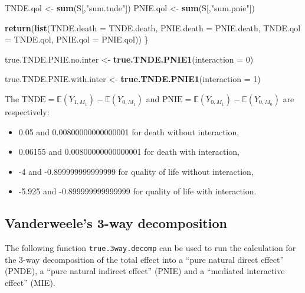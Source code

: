 \documentclass[
]{book}
\newenvironment{Shaded}{\begin{snugshade}}{\end{snugshade}}
\newcommand{\AttributeTok}[1]{\textcolor[rgb]{0.13,0.29,0.53}{#1}}
\newcommand{\DecValTok}[1]{\textcolor[rgb]{0.00,0.00,0.81}{#1}}
\newcommand{\FunctionTok}[1]{\textcolor[rgb]{0.13,0.29,0.53}{\textbf{#1}}}
\newcommand{\NormalTok}[1]{#1}
\newcommand{\OtherTok}[1]{\textcolor[rgb]{0.56,0.35,0.01}{#1}}
\newcommand{\StringTok}[1]{\textcolor[rgb]{0.31,0.60,0.02}{#1}}
\providecommand{\tightlist}{%
  \setlength{\itemsep}{0pt}\setlength{\parskip}{0pt}}
\begin{document}
\begin{Shaded}
\begin{Highlighting}[]
\NormalTok{  TNDE.qol }\OtherTok{\textless{}{-}} \FunctionTok{sum}\NormalTok{(S[,}\StringTok{"sum.tnde"}\NormalTok{])}
\NormalTok{  PNIE.qol }\OtherTok{\textless{}{-}} \FunctionTok{sum}\NormalTok{(S[,}\StringTok{"sum.pnie"}\NormalTok{])}
   
  \FunctionTok{return}\NormalTok{(}\FunctionTok{list}\NormalTok{(}\AttributeTok{TNDE.death =}\NormalTok{ TNDE.death, }\AttributeTok{PNIE.death =}\NormalTok{ PNIE.death, }
              \AttributeTok{TNDE.qol =}\NormalTok{ TNDE.qol, }\AttributeTok{PNIE.qol =}\NormalTok{ PNIE.qol))}
\NormalTok{\}}
\end{Highlighting}
\end{Shaded}

\begin{Shaded}
\begin{Highlighting}[]
\NormalTok{true.TNDE.PNIE.no.inter }\OtherTok{\textless{}{-}} \FunctionTok{true.TNDE.PNIE1}\NormalTok{(}\AttributeTok{interaction =} \DecValTok{0}\NormalTok{)}

\NormalTok{true.TNDE.PNIE.with.inter }\OtherTok{\textless{}{-}} \FunctionTok{true.TNDE.PNIE1}\NormalTok{(}\AttributeTok{interaction =} \DecValTok{1}\NormalTok{)}
\end{Highlighting}
\end{Shaded}

The \(\text{TNDE}=\mathbb{E}\left( Y_{1,M_1}\right) - \mathbb{E}\left(Y_{0,M_1}\right)\) and \(\text{PNIE}=\mathbb{E}\left( Y_{0,M_1}\right) - \mathbb{E}\left(Y_{0,M_0}\right)\) are respectively:

\begin{itemize}
\tightlist
\item
  0.05 and 0.00800000000000001 for death without interaction,
\item
  0.06155 and 0.00800000000000001 for death with interaction,
\item
  -4 and -0.899999999999999 for quality of life without interaction,
\item
  -5.925 and -0.899999999999999 for quality of life with interaction.
\end{itemize}

\hypertarget{vanderweeles-3-way-decomposition}{%
\subsection{Vanderweele's 3-way decomposition}\label{vanderweeles-3-way-decomposition}}

The following function \texttt{true.3way.decomp} can be used to run the calculation for the 3-way decomposition of the total effect into a ``pure natural direct effect'' (PNDE), a ``pure natural indirect effect'' (PNIE) and a ``mediated interactive effect'' (MIE).
\end{document}
